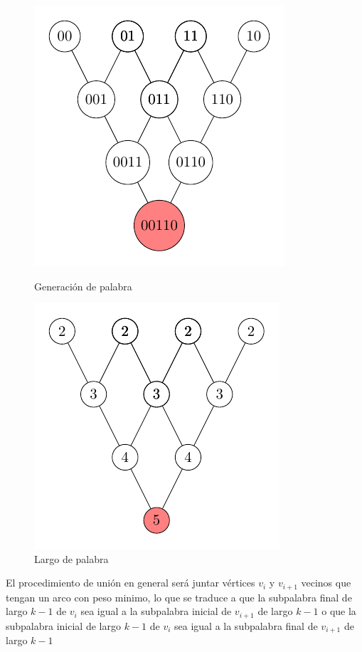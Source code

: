 \documentclass[letterpaper,10pt,table, dvipsnames]{article}
\begin{document}
\begin{figure}[!htb]
  \begin{minipage}{0.48\textwidth}
     \centering
     \includegraphics[scale=1]{pictures/t3/ej4.pdf}
     \caption{Generación de palabra}\label{fig:ej3}
   \end{minipage}\hfill
   \begin{minipage}{0.48\textwidth}
     \centering
   \includegraphics[scale=1]{pictures/t3/ej3.pdf}
   \caption{Largo de palabra}\label{fig:ej3}
   \end{minipage}
 \end{figure} 

El procedimiento de unión en general será juntar vértices $v_i$ y $v_{i+1}$ vecinos que tengan un arco con peso minimo, lo que se traduce a que la subpalabra final de largo $k-1$ de $v_i$ sea igual a la subpalabra inicial de $v_{i+1}$ de largo $k-1$ o que la subpalabra inicial de largo $k-1$ de $v_i$ sea igual a la subpalabra final de $v_{i+1}$ de largo $k-1$
\end{document}
